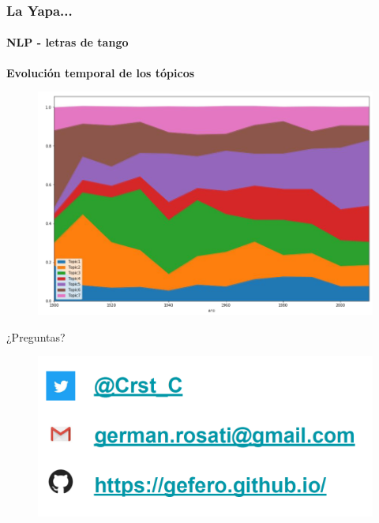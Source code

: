\documentclass{beamer}
\begin{document}
\begin{frame}
\frametitle{La Yapa... }
\framesubtitle{NLP - letras de tango }
\small{\textbf{Evolución temporal de los tópicos}}
\begin{figure}
	\centering
	\includegraphics[width=0.9 \linewidth, height=0.7 \textheight]{../img/tango2}
\end{figure}
\end{frame}

\begin{frame}
	\begin{center}
	{\huge ¿Preguntas?
		\linebreak}
	\begin{figure}
		\centering
		\includegraphics[width=0.7\linewidth, height=0.5\textheight]{../img/end}
		\label{fig:end}
	\end{figure}
	
	\end{center}
\end{frame}
\end{document}
